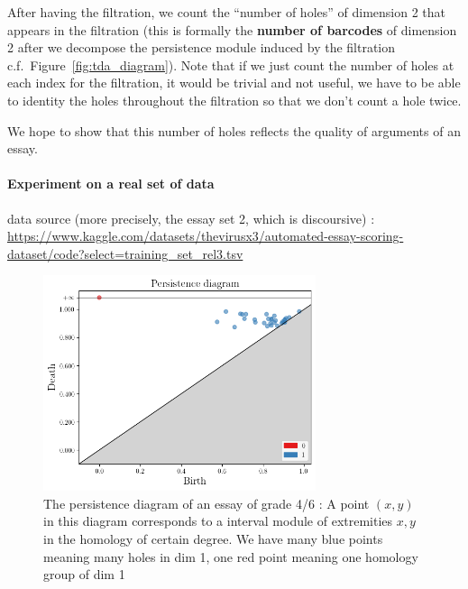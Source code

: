 After having the filtration, we count the ``number of holes'' of dimension 2
that appears in the filtration (this is formally the \textbf{number of
barcodes} of dimension 2 after we decompose the persistence module
induced by the filtration c.f.\ Figure~\ref{fig:tda_diagram}).
Note that if we just count the number of holes at each index for the filtration,
it would be trivial and not useful, we have to be able to identity the holes
throughout the filtration so that we don't count a hole twice.

We hope to show that this number of holes reflects the quality of arguments of an essay.

\paragraph{Experiment on a real set of data}

data source (more precisely, the essay set 2, which is discoursive) :
\url{https://www.kaggle.com/datasets/thevirusx3/automated-essay-scoring-dataset/code?select=training_set_rel3.tsv}

\begin{figure}[H]
\centering
\includegraphics[width=8cm]{pdessay.png}
\caption{The persistence diagram of an essay of grade 4/6 : A point $(x, y)$ in this diagram corresponds to
a interval module of extremities $x, y$ in the homology of certain degree.
We have many blue points meaning many holes in dim 1, one red point meaning
one homology group of dim 1
}
\label{fig:pd}
\end{figure}

